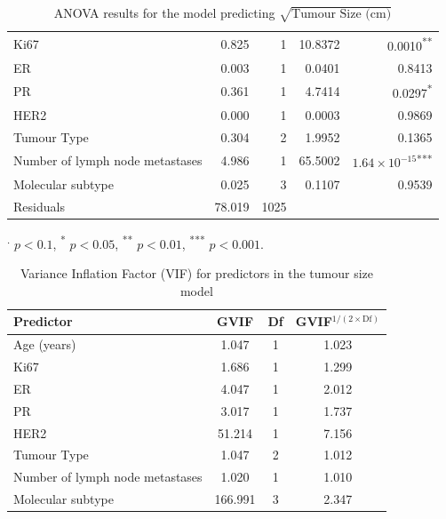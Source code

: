 \documentclass[letter]{article}
\begin{document}
\begin{table}[htbp]
\begin{tabular}{lrrrr}
Ki67                                & 0.825 & 1 & 10.8372 & 0.0010\textsuperscript{**} \\
ER                                  & 0.003 & 1 & 0.0401 & 0.8413 \\
PR                                  & 0.361 & 1 & 4.7414 & 0.0297\textsuperscript{*} \\
HER2                                & 0.000 & 1 & 0.0003 & 0.9869 \\
Tumour Type                         & 0.304 & 2 & 1.9952 & 0.1365 \\
Number of lymph node metastases     & 4.986 & 1 & 65.5002 & $1.64\times10^{-15}$\textsuperscript{***} \\
Molecular subtype                   & 0.025 & 3 & 0.1107 & 0.9539 \\
Residuals                           & 78.019 & 1025 &  &  \\
\hline
\end{tabular}
\begin{flushleft}
\textsuperscript{.} $p < 0.1$, \textsuperscript{*} $p < 0.05$, \textsuperscript{**} $p < 0.01$, \textsuperscript{***} $p < 0.001$.
\end{flushleft}
\caption{ANOVA results for the model predicting $\sqrt{\text{Tumour Size (cm)}}$}
\end{table}

\begin{table}[ht]
\centering
\label{tab:vif}
\begin{tabular}{lccc}
\hline
\textbf{Predictor} & \textbf{GVIF} & \textbf{Df} & \textbf{GVIF$^{1/(2 \times \text{Df})}$} \\
\hline
Age (years) & 1.047 & 1 & 1.023 \\
Ki67 & 1.686 & 1 & 1.299 \\
ER & 4.047 & 1 & 2.012 \\
PR & 3.017 & 1 & 1.737 \\
HER2 & 51.214 & 1 & 7.156 \\
Tumour Type & 1.047 & 2 & 1.012 \\
Number of lymph node metastases & 1.020 & 1 & 1.010 \\
Molecular subtype & 166.991 & 3 & 2.347 \\
\hline
\end{tabular}
\caption{Variance Inflation Factor (VIF) for predictors in the tumour size model}
\end{table}

\newpage
\end{document}
